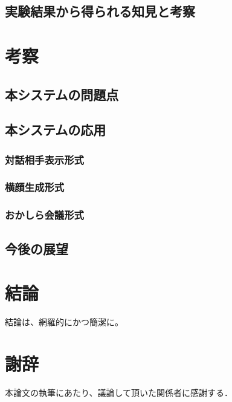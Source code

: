 \documentclass[11pt,oneside,openany,report]{jsbook}
\begin{document}
\section{実験結果から得られる知見と考察}

\chapter{考察}
\section{本システムの問題点}
\section{本システムの応用}
  \subsection{対話相手表示形式}
  \subsection{横顔生成形式}
  \subsection{おかしら会議形式}
\section{今後の展望}



\chapter{結論}
結論は、網羅的にかつ簡潔に。





\backmatter
\chapter{謝辞}
本論文の執筆にあたり、議論して頂いた関係者に感謝する．




\begin{thebibliography}{99}
  
\end{thebibliography}
\end{document}
